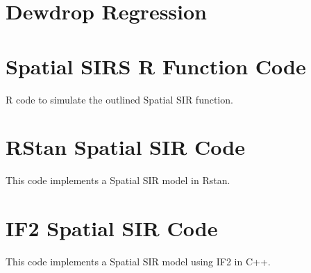 \documentclass[12pt]{article}
\begin{document}
\section{Dewdrop Regression}



\newpage
\begin{appendices}

	\section{Spatial SIRS R Function Code}

		R code to simulate the outlined Spatial SIR function.

		

	\section{RStan Spatial SIR Code}

	    This code implements a Spatial SIR model in Rstan.

	    

    \section{IF2 Spatial SIR Code}

	    This code implements a Spatial SIR model using IF2 in C++.

	    

\end{appendices}
\end{document}
